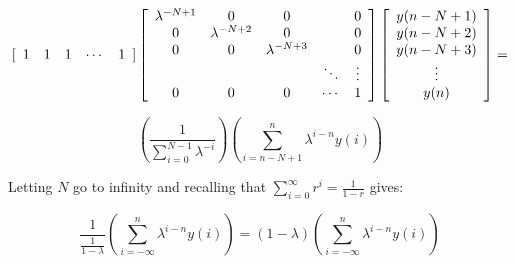 \documentclass{article}
\begin{document}
\begin{enumerate}[(a)]
\[
[\begin{array}{c c c c c}
1 & 1 & 1 & \cdots & 1
\end{array}]
\left[ \begin{array}{c c c c c}
\lambda^{-N+1} & 0 & 0 & & 0 \\
0 & \lambda^{-N+2} & 0 & & 0 \\
0 & 0 & \lambda^{-N+3} & & 0\\
& & & \ddots & \vdots \\
0 & 0 & 0 & \cdots & 1\\
\end{array} \right]
\left[ \begin{array}{c}
y(n-N+1)\\
y(n-N+2)\\
y(n-N+3)\\
\vdots\\
y(n)\\
\end{array}\right] =
\]

\[
\left( \frac{1}{\sum_{i=0}^{N-1} \lambda^{-i}} \right)
\left( \sum_{i=n-N+1}^n \lambda^{i-n}y(i) \right)
\]

\vspace{6pt}

Letting $N$ go to infinity and recalling that
$\sum_{i=0}^{\infty} r^i = \frac{1}{1-r}$ gives:

\[
\frac{1}{\frac{1}{1-\lambda}}\left( \sum_{i=-\infty}^n \lambda^{i-n}y(i) \right)
= (1-\lambda)\left( \sum_{i=-\infty}^n \lambda^{i-n}y(i) \right)
\]

\end{enumerate}
\end{document}

